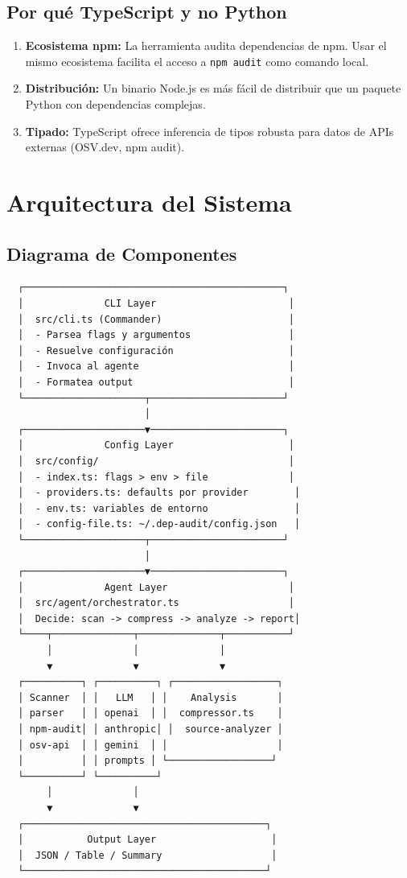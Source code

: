 \documentclass[11pt,a4paper]{article}
\begin{document}
\subsection{Por qué TypeScript y no Python}

\begin{enumerate}
  \item \textbf{Ecosistema npm:} La herramienta audita dependencias de npm. Usar el mismo ecosistema facilita el acceso a \texttt{npm audit} como comando local.
  \item \textbf{Distribución:} Un binario Node.js es más fácil de distribuir que un paquete Python con dependencias complejas.
  \item \textbf{Tipado:} TypeScript ofrece inferencia de tipos robusta para datos de APIs externas (OSV.dev, npm audit).
\end{enumerate}

\section{Arquitectura del Sistema}

\subsection{Diagrama de Componentes}

\begin{verbatim}
  ┌─────────────────────────────────────────────┐
  │              CLI Layer                       │
  │  src/cli.ts (Commander)                      │
  │  - Parsea flags y argumentos                 │
  │  - Resuelve configuración                    │
  │  - Invoca al agente                          │
  │  - Formatea output                           │
  └─────────────────────┬───────────────────────┘
                        │
  ┌─────────────────────▼───────────────────────┐
  │              Config Layer                    │
  │  src/config/                                 │
  │  - index.ts: flags > env > file              │
  │  - providers.ts: defaults por provider        │
  │  - env.ts: variables de entorno               │
  │  - config-file.ts: ~/.dep-audit/config.json   │
  └─────────────────────┬───────────────────────┘
                        │
  ┌─────────────────────▼───────────────────────┐
  │              Agent Layer                     │
  │  src/agent/orchestrator.ts                   │
  │  Decide: scan -> compress -> analyze -> report│
  └────┬──────────────┬──────────────┬───────────┘
       │              │              │
       ▼              ▼              ▼
  ┌──────────┐ ┌──────────┐ ┌──────────────────┐
  │ Scanner  │ │   LLM   │ │    Analysis       │
  │ parser   │ │ openai  │ │  compressor.ts    │
  │ npm-audit│ │ anthropic│ │  source-analyzer │
  │ osv-api  │ │ gemini  │ │                   │
  │          │ │ prompts │ └──────────────────┘
  └──────────┘ └──────────┘
       │              │
       ▼              ▼
  ┌──────────────────────────────────────────┐
  │           Output Layer                    │
  │  JSON / Table / Summary                   │
  └──────────────────────────────────────────┘
\end{verbatim}
\end{document}
